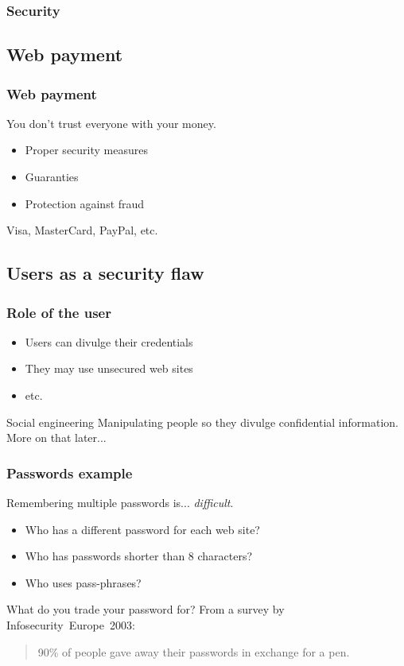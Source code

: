 \begin{frame}
\frametitle{Security}
\end{frame}

\subsection{Web payment}

\begin{frame}
\frametitle{Web payment}
\begin{center}
You don't trust everyone with your money.
\end{center}
\begin{itemize}
\item Proper security measures
\item Guaranties
\item Protection against fraud
\end{itemize}
\begin{example}
Visa, MasterCard, PayPal, etc.
\end{example}
\end{frame}

\subsection{Users as a security flaw}

\begin{frame}
\frametitle{Role of the user}
\begin{itemize}
\item Users can divulge their credentials
\item They may use unsecured web sites
\item etc.
\end{itemize}
\begin{block}{Social engineering}
Manipulating people so they divulge confidential information.
\\ More on that later...
\end{block}
\end{frame}

\begin{frame}
\frametitle{Passwords example}
Remembering multiple passwords is... \emph{difficult}.
\begin{itemize}
\item Who has a different password for each web site?
\item Who has passwords shorter than 8 characters?
\item Who uses pass-phrases?
\end{itemize}
\pause
\begin{exampleblock}{What do you trade your password for?}
From a survey by Infosecurity~Europe~2003:
\begin{quote}
90\% of people gave away their passwords in exchange for a pen.
\end{quote}
\end{exampleblock}
\end{frame}

